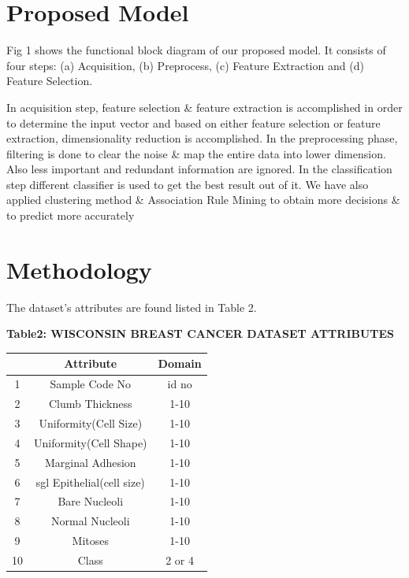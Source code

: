 \documentclass[11pt]{article}
\begin{document}
\section{Proposed Model}

Fig 1 shows the functional block diagram of our proposed model. It consists of four steps: (a) Acquisition, (b) Preprocess, (c) Feature Extraction and (d) Feature Selection.

In acquisition step, feature selection \& feature extraction is accomplished in order to determine the input vector and based on either feature selection or feature extraction, dimensionality reduction is accomplished. In the preprocessing phase, filtering is done to clear the noise \& map the entire data into lower dimension. Also less important and redundant information are ignored. In the classification step different classifier is used to get the best result out of it. We have also applied clustering method \& Association Rule Mining to obtain more decisions \& to predict more accurately
\section{Methodology}

The dataset's attributes are found listed in Table 2.
\vspace{.5 cm}
 \begin{center}
     \textbf{Table2: WISCONSIN BREAST CANCER DATASET ATTRIBUTES}
   \end{center}

    \begin{tabular}{|c|c|c|}
      \hline
      & Attribute & Domain\\
      \hline
      1 & Sample Code No & id no\\
      \hline
      2 & Clumb Thickness & 1-10\\
      \hline
      3 & Uniformity(Cell Size) & 1-10\\
      \hline
      4 & Uniformity(Cell Shape) & 1-10\\
       \hline
      5 & Marginal Adhesion & 1-10\\
       \hline
      6 & sgl Epithelial(cell size) & 1-10\\
       \hline
      7 & Bare Nucleoli & 1-10\\
       \hline
      8 & Normal Nucleoli & 1-10\\
       \hline
      9 & Mitoses & 1-10\\
       \hline
      10 & Class & 2 or 4\\
      \hline
    \end{tabular}
\end{document}
